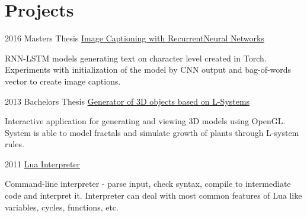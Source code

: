 \documentclass{tccv}
\begin{document}
\section{Projects}

\begin{eventlist}
	
	\item{2016}
	{Masters Thesis}
	{\href{https://github.com/kvitajakub/MasterThesis}{Image Captioning with Recurrent\newline Neural Networks}}
	
	RNN-LSTM models generating text on character level created in Torch. Experiments with initialization of the model by CNN output and bag-of-words vector to create image captions. 
	
	\item{2013}
	{Bachelors Thesis}
	{\href{https://github.com/kvitajakub/LSystemModeller}{Generator of 3D objects based on L-Systems}}
	
	Interactive application for generating and viewing 3D models using OpenGL. System is able to model fractals and simulate growth of plants through L-system rules.
	
	\item{2011}
	{\hspace{3mm}}
	{\href{https://github.com/kvitajakub/interpreterLua}{Lua Interpreter}}
	
	Command-line interpreter - parse input, check syntax, compile to intermediate code and interpret it. Interpreter can deal with most common features of Lua like variables, cycles, functions, etc.
	
\end{eventlist}
\end{document}
